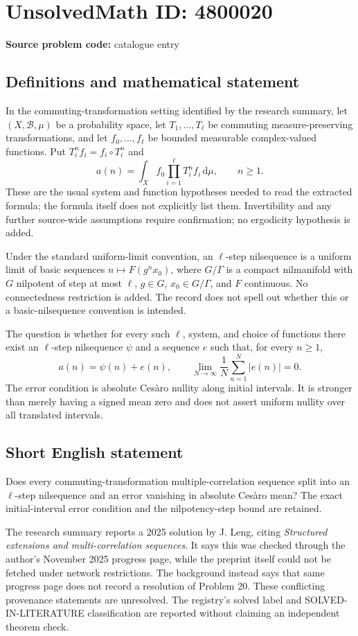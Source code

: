 \documentclass[11pt]{article}
\begin{document}
\section*{UnsolvedMath ID: 4800020}
\textbf{Source problem code:} catalogue entry
\subsection{Definitions and mathematical statement}
In the commuting-transformation setting identified by the research summary, let $(X,\mathcal B,\mu)$ be a probability space, let $T_1,\ldots,T_\ell$ be commuting measure-preserving transformations, and let $f_0,\ldots,f_\ell$ be bounded measurable complex-valued functions. Put $T_i^nf_i=f_i\circ T_i^n$ and
\[
 a(n)=\int_X f_0\prod_{i=1}^{\ell}T_i^nf_i\,\mathrm d\mu,
 \qquad n\ge1.
\]
These are the usual system and function hypotheses needed to read the extracted formula; the formula itself does not explicitly list them. Invertibility and any further source-wide assumptions require confirmation; no ergodicity hypothesis is added.

Under the standard uniform-limit convention, an $\ell$-step nilsequence is a uniform limit of basic sequences $n\mapsto F(g^nx_0)$, where $G/\Gamma$ is a compact nilmanifold with $G$ nilpotent of step at most $\ell$, $g\in G$, $x_0\in G/\Gamma$, and $F$ continuous. No connectedness restriction is added. The record does not spell out whether this or a basic-nilsequence convention is intended.

The question is whether for every such $\ell$, system, and choice of functions there exist an $\ell$-step nilsequence $\psi$ and a sequence $e$ such that, for every $n\ge1$,
\[
 a(n)=\psi(n)+e(n),\qquad
 \lim_{N\to\infty}\frac1N\sum_{n=1}^N|e(n)|=0.
\]
The error condition is absolute Cesàro nullity along initial intervals. It is stronger than merely having a signed mean zero and does not assert uniform nullity over all translated intervals.
\subsection{Short English statement}
Does every commuting-transformation multiple-correlation sequence split into an $\ell$-step nilsequence and an error vanishing in absolute Cesàro mean? The exact initial-interval error condition and the nilpotency-step bound are retained.

The research summary reports a 2025 solution by J. Leng, citing \emph{Structured extensions and multi-correlation sequences}. It says this was checked through the author's November 2025 progress page, while the preprint itself could not be fetched under network restrictions. The background instead says that same progress page does not record a resolution of Problem 20. These conflicting provenance statements are unresolved. The registry's solved label and SOLVED-IN-LITERATURE classification are reported without claiming an independent theorem check.
\end{document}
